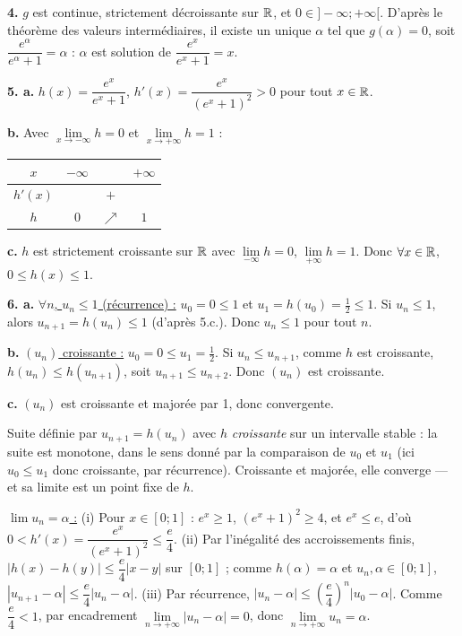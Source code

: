 \documentclass[11pt]{article}
\begin{document}
\textbf{4.} $g$ est continue, strictement décroissante sur $\mathbb{R}$, et $0 \in ]-\infty;+\infty[$. D'après le théorème des valeurs intermédiaires, il existe un unique $\alpha$ tel que $g(\alpha) = 0$, soit $\dfrac{e^\alpha}{e^\alpha + 1} = \alpha$ : $\alpha$ est solution de $\dfrac{e^x}{e^x+1} = x$.

\textbf{5. a.} $h(x) = \dfrac{e^x}{e^x+1}$, $h'(x) = \dfrac{e^x}{(e^x+1)^2} > 0$ pour tout $x \in \mathbb{R}$.

\textbf{b.} Avec $\lim\limits_{x\to-\infty} h = 0$ et $\lim\limits_{x\to+\infty} h = 1$ :
\begin{center}\renewcommand{\arraystretch}{1.4}
\begin{tabular}{|c|ccc|}
\hline $x$ & $-\infty$ & & $+\infty$ \\\hline $h'(x)$ & & $+$ & \\\hline $h$ & $0$ & $\nearrow$ & $1$ \\\hline
\end{tabular}
\end{center}

\textbf{c.} $h$ est strictement croissante sur $\mathbb{R}$ avec $\lim\limits_{-\infty} h = 0$, $\lim\limits_{+\infty} h = 1$. Donc $\forall x \in \mathbb{R}$, $0 \le h(x) \le 1$.

\textbf{6. a.} \underline{$\forall n$, $u_n \le 1$ (récurrence) :} $u_0 = 0 \le 1$ et $u_1 = h(u_0) = \tfrac{1}{2} \le 1$. Si $u_n \le 1$, alors $u_{n+1} = h(u_n) \le 1$ (d'après 5.c.). Donc $u_n \le 1$ pour tout $n$.

\textbf{b.} \underline{$(u_n)$ croissante :} $u_0 = 0 \le u_1 = \tfrac{1}{2}$. Si $u_n \le u_{n+1}$, comme $h$ est croissante, $h(u_n) \le h(u_{n+1})$, soit $u_{n+1} \le u_{n+2}$. Donc $(u_n)$ est croissante.

\textbf{c.} $(u_n)$ est croissante et majorée par 1, donc convergente.

\begin{methode}
Suite définie par $u_{n+1} = h(u_n)$ avec $h$ \emph{croissante} sur un
intervalle stable : la suite est monotone, dans le sens donné par la
comparaison de $u_0$ et $u_1$ (ici $u_0 \le u_1$ donc croissante, par
récurrence). Croissante et majorée, elle converge — et sa limite est
un point fixe de $h$.
\end{methode}

\underline{$\lim u_n = \alpha$ :} (i) Pour $x \in [0;1]$ : $e^x \ge 1$, $(e^x+1)^2 \ge 4$, et $e^x \le e$, d'où $0 < h'(x) = \dfrac{e^x}{(e^x+1)^2} \le \dfrac{e}{4}$. (ii) Par l'inégalité des accroissements finis, $|h(x) - h(y)| \le \dfrac{e}{4}|x - y|$ sur $[0;1]$ ; comme $h(\alpha) = \alpha$ et $u_n, \alpha \in [0;1]$, $|u_{n+1} - \alpha| \le \dfrac{e}{4}|u_n - \alpha|$. (iii) Par récurrence, $|u_n - \alpha| \le \left(\dfrac{e}{4}\right)^n|u_0 - \alpha|$. Comme $\dfrac{e}{4} < 1$, par encadrement $\lim\limits_{n\to+\infty}|u_n - \alpha| = 0$, donc $\lim\limits_{n\to+\infty} u_n = \alpha$.
\end{document}
